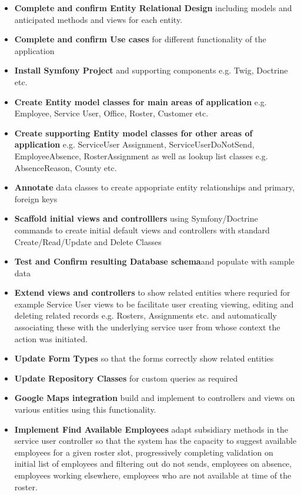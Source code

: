 \documentclass[a4paper,12pt]{article}
\begin{document}
\begin {itemize}
\item  \textbf{Complete and confirm Entity Relational Design} including models and anticipated methods and views for each entity.
 \item  \textbf{Complete and confirm Use cases } for different functionality of the application
\item  \textbf{Install Symfony Project} and supporting components e.g. Twig, Doctrine etc.
\item  \textbf{Create Entity model classes for main areas of application} e.g. Employee, Service User, Office, Roster, Customer etc.
\item  \textbf{Create supporting Entity model classes for other areas of application} e.g. ServiceUser Assignment, 
ServiceUserDoNotSend, EmployeeAbsence, RosterAssignment as well as lookup list classes e.g. AbsenceReason, County etc. 
\item  \textbf{Annotate} data classes to create appopriate entity relationships and primary, foreign keys 
\item  \textbf{Scaffold initial views and controlllers} using Symfony/Doctrine commands to create initial default views and controllers with standard Create/Read/Update and Delete Classes
\item  \textbf{Test and Confirm resulting Database schema}and populate with sample data
\item  \textbf{Extend views and controllers }to show related entities where requried for example Service User views to be facilitate user creating viewing, editing and deleting related records e.g. Rosters, Assignments etc. and automatically associating these with the underlying service user from whose context the action was initiated.
\item  \textbf{Update Form Types} so that the forms correctly show related entities
\item  \textbf{Update Repository Classes} for custom queries as required
\item  \textbf{Google Maps integration} build and implement to controllers and views on various entities using this functionality.
\item  \textbf{Implement Find Available Employees} adapt subsidiary methods in the service user controller so that the system has the capacity to suggest available employees for a given roster slot, progressively completing validation on initial list of employees and filtering out do not sends, employees on absence, employees working elsewhere, employees who are not available at time of the roster.

\end{itemize}
\end{document}
